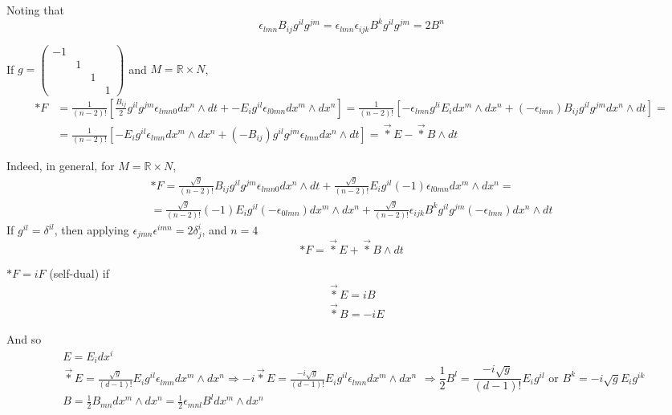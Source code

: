 \documentclass[10pt]{amsart}
\begin{document}
\begin{multicols*}{2}
Noting that 
\[
\epsilon_{lmn} B_{ij} g^{il} g^{jm} = \epsilon_{lmn} \epsilon_{ijk} B^k g^{il} g^{jm} = 2B^n
\]


If $g= \left( \begin{matrix} -1  & & & \\
  & 1 & & \\
  &  & 1 & \\
  & & & 1 \end{matrix} \right)$ and $M = \mathbb{R} \times N$, 
\[
\begin{aligned}
  *F & = \frac{1}{ (n-2)!} \left[ \frac{B_{ij}}{2} g^{il }g^{jm} \epsilon_{lmn0} dx^n \wedge dt + -E_i g^{il} \epsilon_{l0mn} dx^m \wedge dx^n \right] = \frac{1}{(n-2)!} \left[ -\epsilon_{lmn} g^{li} E_i dx^m \wedge dx^n + (-\epsilon_{lmn})B_{ij} g^{il} g^{jm} dx^n \wedge dt \right] = \\
  & = \frac{1}{(n-2)!} \left[ -E_i g^{il} \epsilon_{lmn} dx^m \wedge dx^n + (-B_{ij}) g^{il} g^{jm} \epsilon_{lmn} dx^n \wedge dt \right] = \vec{*} E - \vec{*}B \wedge dt
\end{aligned}
\]

Indeed, in general, for $M = \mathbb{R}\times N$, 
\[
\begin{gathered}
  *F = \frac{ \sqrt{g}}{ (n-2)!} B_{ij} g^{il}g^{jm} \epsilon_{lmn0} dx^n \wedge dt + \frac{\sqrt{g}}{(n-2)!} E_i g^{il} (-1) \epsilon_{l0mn} dx^m \wedge dx^n = \\
  =  \frac{\sqrt{g}}{ (n-2)!}(-1)E_i g^{il} (-\epsilon_{0lmn}) dx^m \wedge dx^n + \frac{\sqrt{g}}{(n-2)!} \epsilon_{ijk} B^k g^{il} g^{jm} (-\epsilon_{lmn})dx^n \wedge dt
\end{gathered}
\]
If $g^{il}= \delta^{il}$, then applying $\epsilon_{jmn}\epsilon^{imn} = 2\delta^i_j$, and $n=4$
\[
*F = \vec{*}E + \vec{*}B \wedge dt
\]

$*F = iF$ (self-dual) if 
\[
\begin{aligned}
  & \vec{*} E= iB \\ 
  & \vec{*} B= -i E
\end{aligned}
\]

And so 
\[
\begin{gathered}
  E = E_i dx^i \\ 
  \vec{*} E = \frac{ \sqrt{g}}{ (d-1)!} E_i g^{il} \epsilon_{lmn} dx^m \wedge dx^n \Longrightarrow -i \vec{*} E = \frac{-i\sqrt{g}}{ (d-1)!} E_i g^{il} \epsilon_{lmn} dx^m \wedge dx^n \\ 
  B = \frac{1}{2} B_{mn} dx^m \wedge dx^n = \frac{1}{2} \epsilon_{mnl} B^l dx^m \wedge dx^n 
\end{gathered} \Longrightarrow \frac{1}{2} B^l = \frac{-i \sqrt{g}}{ (d-1)!} E_i g^{il} \text{ or } B^k = -i \sqrt{g} E_i g^{ik}
\]



\end{multicols*}
\end{document}
